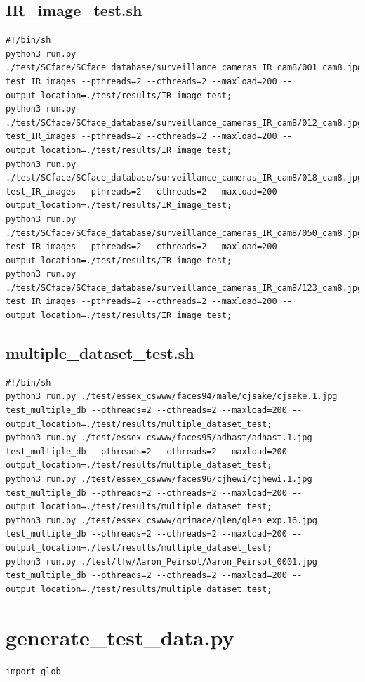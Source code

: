 \documentclass[12pt]{article}
\begin{document}
\begin{appendices}
\subsection{IR\_image\_test.sh}
\begin{lstlisting}
#!/bin/sh
python3 run.py ./test/SCface/SCface_database/surveillance_cameras_IR_cam8/001_cam8.jpg test_IR_images --pthreads=2 --cthreads=2 --maxload=200 --output_location=./test/results/IR_image_test;
python3 run.py ./test/SCface/SCface_database/surveillance_cameras_IR_cam8/012_cam8.jpg test_IR_images --pthreads=2 --cthreads=2 --maxload=200 --output_location=./test/results/IR_image_test;
python3 run.py ./test/SCface/SCface_database/surveillance_cameras_IR_cam8/018_cam8.jpg test_IR_images --pthreads=2 --cthreads=2 --maxload=200 --output_location=./test/results/IR_image_test;
python3 run.py ./test/SCface/SCface_database/surveillance_cameras_IR_cam8/050_cam8.jpg test_IR_images --pthreads=2 --cthreads=2 --maxload=200 --output_location=./test/results/IR_image_test;
python3 run.py ./test/SCface/SCface_database/surveillance_cameras_IR_cam8/123_cam8.jpg test_IR_images --pthreads=2 --cthreads=2 --maxload=200 --output_location=./test/results/IR_image_test;
\end{lstlisting}

\subsection{multiple\_dataset\_test.sh}
\begin{lstlisting}
#!/bin/sh
python3 run.py ./test/essex_cswww/faces94/male/cjsake/cjsake.1.jpg test_multiple_db --pthreads=2 --cthreads=2 --maxload=200 --output_location=./test/results/multiple_dataset_test;
python3 run.py ./test/essex_cswww/faces95/adhast/adhast.1.jpg test_multiple_db --pthreads=2 --cthreads=2 --maxload=200 --output_location=./test/results/multiple_dataset_test;
python3 run.py ./test/essex_cswww/faces96/cjhewi/cjhewi.1.jpg test_multiple_db --pthreads=2 --cthreads=2 --maxload=200 --output_location=./test/results/multiple_dataset_test;
python3 run.py ./test/essex_cswww/grimace/glen/glen_exp.16.jpg test_multiple_db --pthreads=2 --cthreads=2 --maxload=200 --output_location=./test/results/multiple_dataset_test;
python3 run.py ./test/lfw/Aaron_Peirsol/Aaron_Peirsol_0001.jpg test_multiple_db --pthreads=2 --cthreads=2 --maxload=200 --output_location=./test/results/multiple_dataset_test;
\end{lstlisting}

\section{generate\_test\_data.py}
\begin{lstlisting}
import glob



\end{lstlisting}
\end{appendices}
\end{document}
